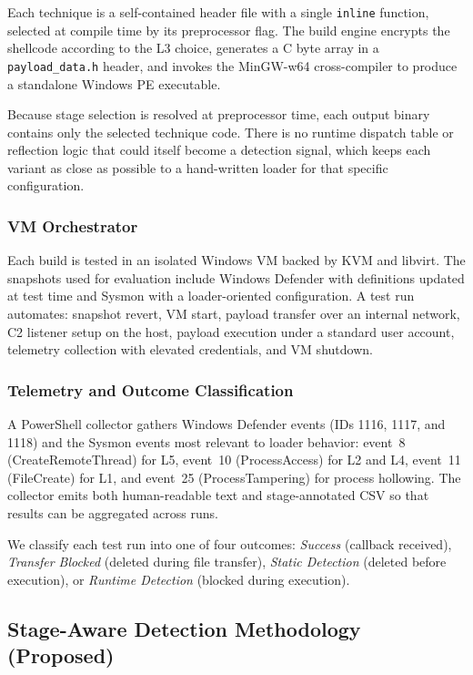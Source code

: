Each technique is a self-contained header file with a single \texttt{inline} function, selected at compile time by its preprocessor flag.
The build engine encrypts the shellcode according to the L3 choice, generates a C byte array in a \texttt{payload\_data.h} header, and invokes the MinGW-w64 cross-compiler to produce a standalone Windows PE executable.

Because stage selection is resolved at preprocessor time, each output binary contains only the selected technique code.
There is no runtime dispatch table or reflection logic that could itself become a detection signal, which keeps each variant as close as possible to a hand-written loader for that specific configuration.

\subsubsection{VM Orchestrator}

Each build is tested in an isolated Windows VM backed by KVM and libvirt.
The snapshots used for evaluation include Windows Defender with definitions updated at test time and Sysmon with a loader-oriented configuration.
A test run automates: snapshot revert, VM start, payload transfer over an internal network, C2 listener setup on the host, payload execution under a standard user account, telemetry collection with elevated credentials, and VM shutdown.

\subsubsection{Telemetry and Outcome Classification}

A PowerShell collector gathers Windows Defender events (IDs 1116, 1117, and 1118) and the Sysmon events most relevant to loader behavior: event~8 (CreateRemoteThread) for L5, event~10 (ProcessAccess) for L2 and L4, event~11 (FileCreate) for L1, and event~25 (ProcessTampering) for process hollowing.
The collector emits both human-readable text and stage-annotated CSV so that results can be aggregated across runs.

We classify each test run into one of four outcomes: \textit{Success} (callback received), \textit{Transfer Blocked} (deleted during file transfer), \textit{Static Detection} (deleted before execution), or \textit{Runtime Detection} (blocked during execution).

\subsection{Stage-Aware Detection Methodology (Proposed)}

